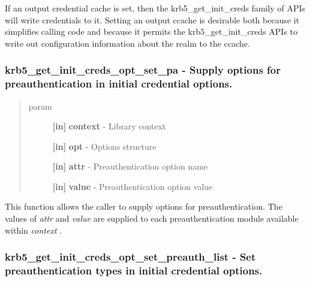 \documentclass[letterpaper,10pt,english]{sphinxmanual}
\begin{document}
If an output credential cache is set, then the krb5\_get\_init\_creds family of APIs will write credentials to it. Setting an output ccache is desirable both because it simplifies calling code and because it permits the krb5\_get\_init\_creds APIs to write out configuration information about the realm to the ccache.


\subsubsection{krb5\_get\_init\_creds\_opt\_set\_pa -  Supply options for preauthentication in initial credential options.}
\label{appdev/refs/api/krb5_get_init_creds_opt_set_pa::doc}\label{appdev/refs/api/krb5_get_init_creds_opt_set_pa:krb5-get-init-creds-opt-set-pa-supply-options-for-preauthentication-in-initial-credential-options}

\begin{fulllineitems}
\label{appdev/refs/api/krb5_get_init_creds_opt_set_pa:krb5_get_init_creds_opt_set_pa}
\end{fulllineitems}

\begin{quote}\begin{description}
\item[{param}] \leavevmode
\textbf{{[}in{]}} \textbf{context} - Library context

\textbf{{[}in{]}} \textbf{opt} - Options structure

\textbf{{[}in{]}} \textbf{attr} - Preauthentication option name

\textbf{{[}in{]}} \textbf{value} - Preauthentication option value

\end{description}\end{quote}

This function allows the caller to supply options for preauthentication. The values of \emph{attr} and \emph{value} are supplied to each preauthentication module available within \emph{context} .


\subsubsection{krb5\_get\_init\_creds\_opt\_set\_preauth\_list -  Set preauthentication types in initial credential options.}
\label{appdev/refs/api/krb5_get_init_creds_opt_set_preauth_list:krb5-get-init-creds-opt-set-preauth-list-set-preauthentication-types-in-initial-credential-options}\label{appdev/refs/api/krb5_get_init_creds_opt_set_preauth_list::doc}
\end{document}
